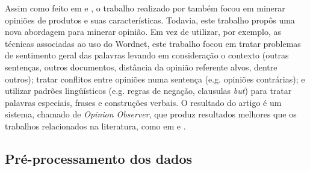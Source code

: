 Assim como feito em \cite{Hu:2004} e \cite{kim2004determining}, o trabalho realizado por \cite{ding2008holistic} também focou em minerar opiniões de produtos e suas características. Todavia, este trabalho propôs uma nova abordagem para minerar opinião. Em vez de utilizar, por exemplo, as técnicas associadas ao uso do Wordnet, este trabalho focou em tratar problemas de sentimento geral das palavras levando em consideração o contexto (outras sentenças, outros documentos, distância da opinião referente alvos, dentre outros); tratar conflitos entre opiniões numa sentença (e.g. opiniões contrárias); e utilizar padrões lingüísticos (e.g. regras de negação, clausulas \textit{but}) para tratar palavras especiais, frases e construções verbais. O resultado do artigo é um sistema, chamado de \textit{Opinion Observer}, que produz resultados melhores que os trabalhos relacionados na literatura, como em \cite{Hu:2004} e  \cite{kim2004determining}.

\subsection{Pré-processamento dos dados}

